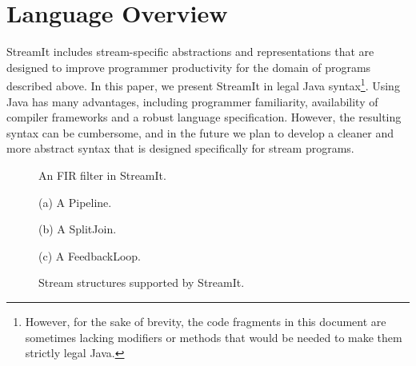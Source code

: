 
\section{Language Overview}
\label{sec:overview}

StreamIt includes stream-specific abstractions and representations
that are designed to improve programmer productivity for the domain of
programs described above.  In this paper, we present StreamIt in legal
Java syntax\footnote{However, for the sake of brevity, the code
fragments in this document are sometimes lacking modifiers or methods
that would be needed to make them strictly legal Java.}.  Using Java
has many advantages, including programmer familiarity, availability of
compiler frameworks and a robust language specification.  However, the
resulting syntax can be cumbersome, and in the future we plan to
develop a cleaner and more abstract syntax that is designed
specifically for stream programs.

\begin{figure}[htpb]
\begin{minipage}{3in}
\caption{\protect\small An FIR filter in StreamIt.~~~~~
\protect\label{fig:firstreamit}}
\end{minipage}
\begin{minipage}{3in}
\centering
\vspace{10pt}

(a) A Pipeline. \\
\vspace{10pt}

(b) A SplitJoin. \\
\vspace{10pt}

(c) A FeedbackLoop. \\
\caption{\protect\small Stream structures supported by StreamIt.
\protect\label{fig:structuresp}
}
\end{minipage}
\vspace{-8pt}
\end{figure}


